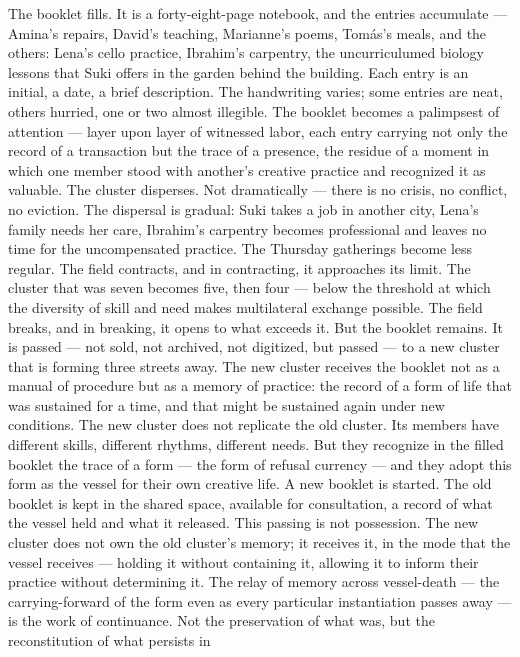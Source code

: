 The booklet fills. It is a forty-eight-page notebook, and the entries accumulate — Amina’s repairs, David’s teaching, Marianne’s poems, Tomás’s meals, and the others: Lena’s cello practice, Ibrahim’s carpentry, the uncurriculumed biology lessons that Suki offers in the garden behind the building. Each entry is an initial, a date, a brief description. The handwriting varies; some entries are neat, others hurried, one or two almost illegible. The booklet becomes a palimpsest of attention — layer upon layer of witnessed labor, each entry carrying not only the record of a transaction but the trace of a presence, the residue of a moment in which one member stood with another’s creative practice and recognized it as valuable. The cluster disperses. Not dramatically — there is no crisis, no conflict, no eviction. The dispersal is gradual: Suki takes a job in another city, Lena’s family needs her care, Ibrahim’s carpentry becomes professional and leaves no time for the uncompensated practice. The Thursday gatherings become less regular. The field contracts, and in contracting, it approaches its limit. The cluster that was seven becomes five, then four — below the threshold at which the diversity of skill and need makes multilateral exchange possible. The field breaks, and in breaking, it opens to what exceeds it. But the booklet remains. It is passed — not sold, not archived, not digitized, but passed — to a new cluster that is forming three streets away. The new cluster receives the booklet not as a manual of procedure but as a memory of practice: the record of a form of life that was sustained for a time, and that might be sustained again under new conditions. The new cluster does not replicate the old cluster. Its members have different skills, different rhythms, different needs. But they recognize in the filled booklet the trace of a form — the form of refusal currency — and they adopt this form as the vessel for their own creative life. A new booklet is started. The old booklet is kept in the shared space, available for consultation, a record of what the vessel held and what it released. This passing is not possession. The new cluster does not own the old cluster’s memory; it receives it, in the mode that the vessel receives — holding it without containing it, allowing it to inform their practice without determining it. The relay of memory across vessel-death — the carrying-forward of the form even as every particular instantiation passes away — is the work of continuance. Not the preservation of what was, but the reconstitution of what persists in

